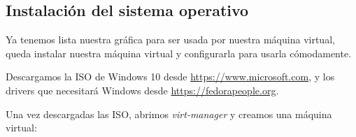 \documentclass[11pt]{article}
\begin{document}
\subsection{Instalación del sistema operativo}

Ya tenemos lista nuestra gráfica para ser usada por nuestra máquina virtual, queda instalar nuestra máquina virtual y configurarla para usarla cómodamente.

\medskip
Descargamos la ISO de Windows 10 desde \href{https://www.microsoft.com/en-us/software-download/windows10ISO}{https://www.microsoft.com}, y los drivers que necesitará Windows desde \href{https://fedorapeople.org/groups/virt/virtio-win/direct-downloads/stable-virtio/virtio-win.iso}{https://fedorapeople.org}.

\medskip
Una vez descargadas las ISO, abrimos \textit{virt-manager} y creamos una máquina virtual:
\end{document}
